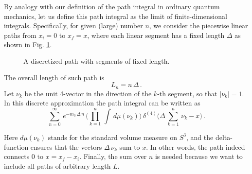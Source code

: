 By analogy with our definition of the path integral in ordinary quantum mechanics, let us define this path integral as the limit of finite-dimensional integrals. Specifically, for given (large) number $n$, we consider the piecewise linear paths from $x_i = 0$ to $x_f = x$, where each linear segment has a fixed length $\Delta$ as shown in Fig. \ref{fig:relativistic-path-discretized}.
\begin{figure}[h]
\centering

\caption{A discretized path with segments of fixed length.}
\label{fig:relativistic-path-discretized}
\end{figure}


The overall length of such path is
$$
L_n = n\,\Delta\,.
$$
Let $\nu_k$ be the unit 4-vector in the direction of the $k$-th segment, so that $|\nu_k| =1$. In this discrete approximation the path integral can be written as
\begin{equation}
    \sum_{n=0}^{\infty}\,e^{-m_0\,\Delta\,n}\,\bigg(\prod_{k=1}^{n}\,\int\,d\mu(\nu_k)
\bigg)\,\delta^{(4)}\big(\Delta\,\sum_{k=1}^{n}\,\nu_k - x\big)\,.
    \label{eq:non-relativistic-path-int}
\end{equation}

Here $d\mu(\nu_k)$ stands for the standard volume measure on $S^3$, and the delta-function ensures that the vectors $\Delta\,\nu_k$ sum to $x$. In other words, the path indeed connects $0$ to $x=x_f-x_i$. Finally, the sum over $n$ is needed because we want to include all paths of arbitrary length $L$.

